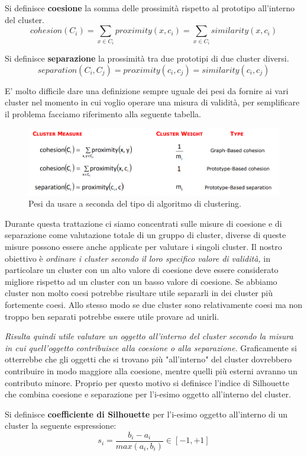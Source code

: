 \begin{defn}
	Si definisce \textbf{coesione} la somma delle prossimità rispetto al prototipo all'interno del  cluster.
	\[ cohesion(C_i) = \sum_{x \in C_i} proximity(x, c_i) = \sum_{x\in C_i} similarity(x, c_i)\]
\end{defn}
\begin{defn}
	Si definisce \textbf{separazione} la prossimità tra due prototipi di due cluster diversi.
	\[separation(C_{i}, C_{j}) = proximity(c_{i}, c_{j}) = similarity(c_{i}, c_{j})   \]
\end{defn}
E' molto difficile dare una definizione sempre uguale dei pesi da fornire ai vari cluster nel momento in cui voglio operare una misura di validità, per semplificare il problema facciamo riferimento alla seguente tabella.
\begin{figure}[H]
	\centering
	\includegraphics[height=0.250 \linewidth]{clustering/pict/pesi_validity.png}
	\caption{Pesi da usare a seconda del tipo di algoritmo di clustering.}
\end{figure}
Durante questa trattazione ci siamo concentrati sulle misure di coesione e di separazione come valutazione totale di un gruppo di cluster, diverse di queste misure possono essere anche applicate per valutare i singoli cluster. Il nostro obiettivo è \textit{ordinare i cluster secondo il loro specifico valore di validità,} in particolare un cluster con un alto valore di coesione deve essere considerato migliore rispetto ad un cluster con un basso valore di coesione.
Se abbiamo cluster non molto coesi potrebbe risultare utile separarli in dei cluster più fortemente coesi. Allo stesso modo se due cluster sono relativamente coesi ma non troppo ben separati potrebbe essere utile provare ad unirli.

\textit{Risulta quindi utile valutare un oggetto all'interno del cluster secondo la misura in cui quell'oggetto contribuisce alla coesione o alla separazione.} Graficamente si otterrebbe che gli oggetti che si trovano più "all'interno" del cluster dovrebbero contribuire in modo maggiore alla coesione, mentre quelli più esterni avranno un contributo minore. Proprio per questo motivo si definisce l'indice di Silhouette che combina coesione e separazione per l'i-esimo oggetto all'interno del cluster.
\begin{defn}
	Si definisce \textbf{coefficiente di Silhouette} per l'i-esimo oggetto all'interno di un cluster la seguente espressione:
	\[s_i = \frac{b_i - a_i}{max(a_i,b_i)} \in [-1,+1]\]
\end{defn}

